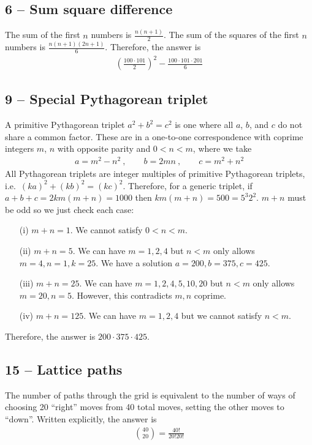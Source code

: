 \documentclass{article}
\begin{document}
\subsection*{6 -- Sum square difference} 
The sum of the first $n$ numbers is $\frac{n(n+1)}{2}$. 
The sum of the squares of the first $n$ numbers is $\frac{n(n+1)(2n+1)}{6}$. 
Therefore, the answer is
\begin{align*}
	\boxed{ \left(\frac{100 \cdot 101}{2}\right)^2 -  \frac{100 \cdot 101 \cdot 201}{6} }
\end{align*}


\subsection*{9 -- Special Pythagorean triplet} 
A primitive Pythagorean triplet $a^2 + b^2 = c^2$ is one where all $a$, $b$, and $c$ do not share a common factor.
These are in a one-to-one correspondence with coprime integers $m$, $n$ with opposite parity and $0 < n < m$, where we take
\begin{align*}
	a = m^2 - n^2 ~, \qquad b = 2mn ~, \qquad c = m^2+n^2
\end{align*}
All Pythagorean triplets are integer multiples of primitive Pythagorean triplets, i.e.~$(ka)^2 + (kb)^2 = (kc)^2$.
Therefore, for a generic triplet, if $a+b+c = 2km(m+n) = 1000$ then $km(m+n) = 500 = 5^3 2^2$. 
$m+n$ must be odd so we just check each case:
\begin{itemize}
	\item[(i)] $m+n = 1$. We cannot satisfy $0 < n < m$. 
	\item[(ii)] $m+n = 5$. We can have $m = 1, 2, 4$ but $n < m$ only allows $m = 4, n = 1, k = 25$. We have a solution $a = 200, b = 375, c = 425$.
	\item[(iii)] $m+n = 25$. We can have $m = 1, 2, 4, 5, 10, 20$ but $n < m$ only allows $m = 20, n = 5$. However, this contradicts $m,n$ coprime.
	\item[(iv)] $m+n=125$. We can have $m = 1, 2, 4$ but we cannot satisfy $n < m$. 
\end{itemize}
Therefore, the answer is $\boxed{ 200 \cdot 375 \cdot 425 }$.


\subsection*{15 -- Lattice paths} 
The number of paths through the grid is equivalent to the number of ways of choosing 20 ``right'' moves from 40 total moves, setting the other moves to ``down''. 
Written explicitly, the answer is 
\begin{align*}
	\boxed{ \binom{40}{20} = \frac{40!}{20!  20!} }
\end{align*}
\end{document}
